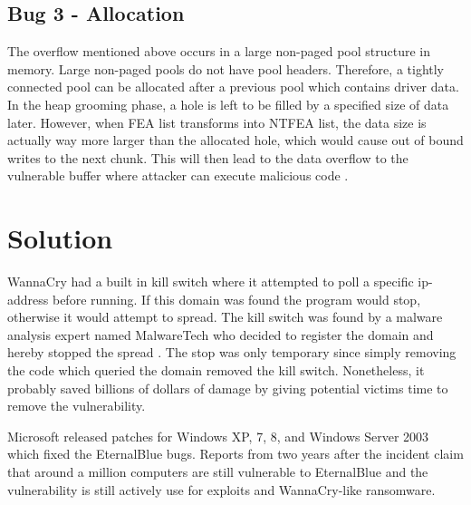 \documentclass[a4paper]{article}
\begin{document}
\subsection{Bug 3 - Allocation}
The overflow mentioned above occurs in a large non-paged pool structure in memory. Large non-paged pools do not have pool headers. Therefore, a tightly connected pool can be allocated after a previous pool which contains driver data. In the heap grooming phase, a hole is left to be filled by a specified size of data later. However, when FEA list transforms into NTFEA list, the data size is actually way more larger than the allocated hole, which would cause out of bound writes to the next chunk. This will then lead to the data overflow to the vulnerable buffer where attacker can execute malicious code \cite{eternalb}.




\section{Solution}
WannaCry had a built in kill switch where it attempted to poll a specific ip-address before running. If this domain was found the program would stop, otherwise it would attempt to spread. The kill switch was found by a malware analysis expert named MalwareTech who decided to register the domain and hereby stopped the spread \cite{malwaretech}.
The stop was only temporary since simply removing the code which queried the domain removed the kill switch. Nonetheless, it probably saved billions of dollars of damage by giving potential victims time to remove the vulnerability.

Microsoft released patches for Windows XP, 7, 8, and Windows Server 2003 which fixed the EternalBlue bugs. Reports from two years after the incident claim that around a million computers are still vulnerable to EternalBlue and the vulnerability is still actively use for exploits and WannaCry-like ransomware.\cite{bleep}


\printbibliography[heading=bibintoc]
\end{document}
